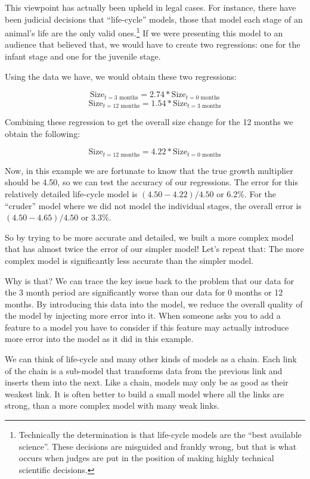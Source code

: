 \documentclass[]{memoir}
\begin{document}
This viewpoint has actually been upheld in legal cases. For instance,
there have been judicial decisions that ``life-cycle'' models, those
that model each stage of an animal's life are the only valid
ones.\footnote{Technically the determination is that life-cycle models
  are the ``best available science''. These decisions are misguided and
  frankly wrong, but that is what occurs when judges are put in the
  position of making highly technical scientific decisions.} If we were
presenting this model to an audience that believed that, we would have
to create two regressions: one for the infant stage and one for the
juvenile stage.

Using the data we have, we would obtain these two regressions:

\[ \text{Size}_{t=\text{3 months}} = 2.74 * \text{Size}_{t=\text{0 months}} \]
\[ \text{Size}_{t=\text{12 months}} = 1.54 * \text{Size}_{t=\text{3 months}} \]

Combining these regression to get the overall size change for the 12
months we obtain the following:

\[ \text{Size}_{t=\text{12 months}} = 4.22 * \text{Size}_{t=\text{0 months}} \]

Now, in this example we are fortunate to know that the true growth
multiplier should be 4.50, so we can test the accuracy of our
regressions. The error for this relatively detailed life-cycle model is
$(4.50-4.22)/4.50$ or 6.2\%. For the ``cruder'' model where we did not
model the individual stages, the overall error is $(4.50-4.65)/4.50$ or
3.3\%.

So by trying to be more accurate and detailed, we built a more complex
model that has almost twice the error of our simpler model! Let's repeat
that: The more complex model is significantly less accurate than the
simpler model.

Why is that? We can trace the key issue back to the problem that our
data for the 3 month period are significantly worse than our data for 0
months or 12 months. By introducing this data into the model, we reduce
the overall quality of the model by injecting more error into it. When
someone asks you to add a feature to a model you have to consider if
this feature may actually introduce more error into the model as it did
in this example.

We can think of life-cycle and many other kinds of models as a chain.
Each link of the chain is a sub-model that transforms data from the
previous link and inserts them into the next. Like a chain, models may
only be as good as their weakest link. It is often better to build a
small model where all the links are strong, than a more complex model
with many weak links.
\end{document}

